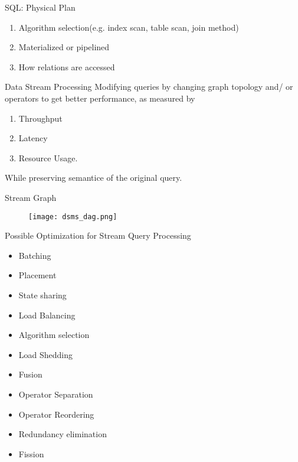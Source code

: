 \begin{frame}{SQL: Physical Plan}
    \begin{enumerate}
        \item Algorithm selection(e.g. index scan, table scan, join method)
        \item Materialized or pipelined
        \item How relations are accessed
    \end{enumerate}
\end{frame}

\begin{frame}{Data Stream Processing}
    Modifying queries by changing graph topology and/ or operators to get better performance, as measured by
    \begin{enumerate}
        \item Throughput
        \item Latency
        \item Resource Usage.
    \end{enumerate}
    While preserving semantice of the original query.
\end{frame}

\begin{frame}{Stream Graph}
    \begin{figure}
        \centering
        \texttt{[image: dsms\_dag.png]}
        \label{fig:j_1}
    \end{figure}
\end{frame}

\begin{frame}{Possible Optimization for Stream Query Processing}
    \begin{itemize}
        \item Batching
        \item Placement
        \item State sharing
        \item Load Balancing
        \item Algorithm selection
        \item Load Shedding
        \item Fusion
        \item Operator Separation
        \item Operator Reordering
        \item Redundancy elimination
        \item Fission
    \end{itemize}
\end{frame}

